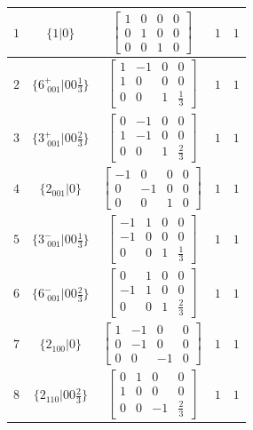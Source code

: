 \documentclass[fleqn,8pt]{jsarticle}
\begin{document}
\begin{longtable}{ccccc}
$ 1 $ & $ \{1|0\} $ & $ \begin{bmatrix} 1 & 0 & 0 & 0 \\ 0 & 1 & 0 & 0 \\ 0 & 0 & 1 & 0 \end{bmatrix} $ & $ 1 $ & $ 1 $ \\ \hline
$ 2 $ & $ \{6^{+}_{\,\,001}|0 0 \frac{1}{3}\} $ & $ \begin{bmatrix} 1 & -1 & 0 & 0 \\ 1 & 0 & 0 & 0 \\ 0 & 0 & 1 & \frac{1}{3} \end{bmatrix} $ & $ 1 $ & $ 1 $ \\ \hline
$ 3 $ & $ \{3^{+}_{\,\,001}|0 0 \frac{2}{3}\} $ & $ \begin{bmatrix} 0 & -1 & 0 & 0 \\ 1 & -1 & 0 & 0 \\ 0 & 0 & 1 & \frac{2}{3} \end{bmatrix} $ & $ 1 $ & $ 1 $ \\ \hline
$ 4 $ & $ \{2{}_{001}|0\} $ & $ \begin{bmatrix} -1 & 0 & 0 & 0 \\ 0 & -1 & 0 & 0 \\ 0 & 0 & 1 & 0 \end{bmatrix} $ & $ 1 $ & $ 1 $ \\ \hline
$ 5 $ & $ \{3^{-}_{\,\,001}|0 0 \frac{1}{3}\} $ & $ \begin{bmatrix} -1 & 1 & 0 & 0 \\ -1 & 0 & 0 & 0 \\ 0 & 0 & 1 & \frac{1}{3} \end{bmatrix} $ & $ 1 $ & $ 1 $ \\ \hline
$ 6 $ & $ \{6^{-}_{\,\,001}|0 0 \frac{2}{3}\} $ & $ \begin{bmatrix} 0 & 1 & 0 & 0 \\ -1 & 1 & 0 & 0 \\ 0 & 0 & 1 & \frac{2}{3} \end{bmatrix} $ & $ 1 $ & $ 1 $ \\ \hline
$ 7 $ & $ \{2{}_{100}|0\} $ & $ \begin{bmatrix} 1 & -1 & 0 & 0 \\ 0 & -1 & 0 & 0 \\ 0 & 0 & -1 & 0 \end{bmatrix} $ & $ 1 $ & $ 1 $ \\ \hline
$ 8 $ & $ \{2{}_{110}|0 0 \frac{2}{3}\} $ & $ \begin{bmatrix} 0 & 1 & 0 & 0 \\ 1 & 0 & 0 & 0 \\ 0 & 0 & -1 & \frac{2}{3} \end{bmatrix} $ & $ 1 $ & $ 1 $ \\ \hline

\end{longtable}
\end{document}
